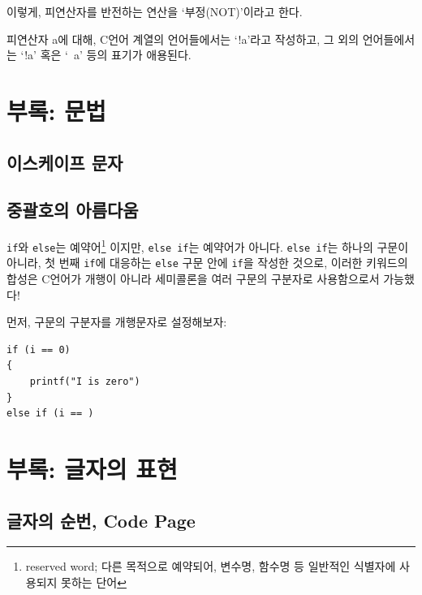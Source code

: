 \documentclass[a4paper,12pt]{book}
\newcommand{\V}[1]{\Verb|#1|}
\begin{document}
\begin{appendices}
이렇게, 피연산자를 반전하는 연산을 `부정(NOT)'이라고 한다.

피연산자 a에 대해, C언어 계열의 언어들에서는 `!a'라고 작성하고,
그 외의 언어들에서는 `!a' 혹은 `~a' 등의 표기가 애용된다.

\chapter{부록: 문법}

\section{이스케이프 문자}
\label{sec:escapes}

\section{중괄호의 아름다움}
\label{sec:code-beauty}

\V{if}와 \V{else}는 예약어\footnote{
    reserved word; 다른 목적으로 예약되어,
    변수명, 함수명 등 일반적인 식별자에 사용되지 못하는 단어
}
이지만, \V{else if}는 예약어가 아니다.
\V{else if}는 하나의 구문이 아니라,
첫 번째 \V{if}에 대응하는 \V{else} 구문 안에 \V{if}을 작성한 것으로,
이러한 키워드의 합성은 C언어가 개행이 아니라 세미콜론을
여러 구문의 구분자로 사용함으로서 가능했다!

먼저, 구문의 구분자를 개행문자로 설정해보자:

\begin{lstlisting}
if (i == 0)
{
    printf("I is zero")
}
else if (i == )
\end{lstlisting}

\chapter{부록: 글자의 표현}

\section{글자의 순번, Code Page}
\label{sec:unicode}







\end{appendices}
\end{document}
